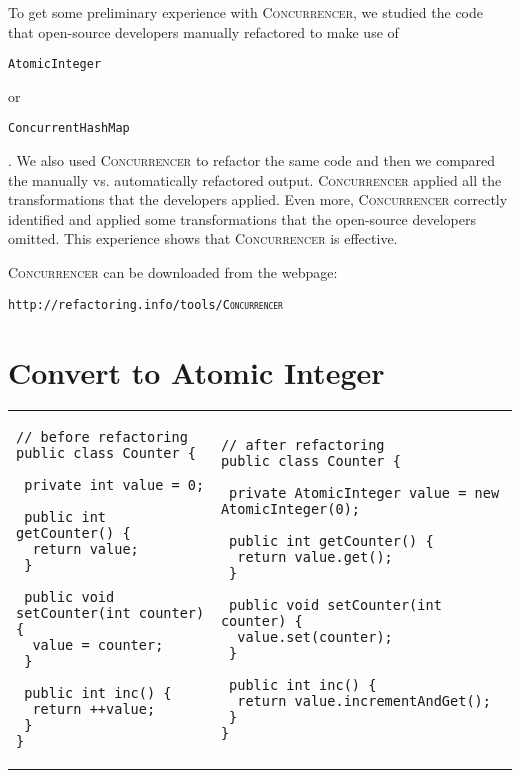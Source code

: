 \documentclass[10pt,preprint]{sigplanconf}
\newcommand\tool{{\smaller\textsc{Concurrencer}}\xspace}
\newenvironment{CodeOut}{\begin{scriptsize}}{\end{scriptsize}}
\newcommand{\code}[1]{\begin{small}\texttt{#1}\end{small}}
\newcommand{\FullWidth}{.95\columnwidth}
\begin{document}

To get some preliminary experience with \tool, we studied
the code that open-source developers manually refactored to make use
of \code{AtomicInteger} or \code{ConcurrentHashMap}. We also used \tool to
refactor the same code and then we compared the manually vs. automatically
refactored output. \tool applied all the
transformations that the developers applied. Even more, \tool correctly
identified and applied some transformations that the open-source developers
omitted. This experience shows that \tool is effective.

\tool can be downloaded from the webpage: \\
\code{http://refactoring.info/tools/\tool}

\section{Convert to Atomic Integer}

\begin{figure*}[t]
\begin{CodeOut}
\begin{tabular}{@{}l|l@{}}
\begin{minipage}[t]{\FullWidth}
\begin{verbatim}
// before refactoring
public class Counter {

 private int value = 0;
        
 public int getCounter() {
  return value;
 }
        
 public void setCounter(int counter) {
  value = counter;
 }
        
 public int inc() {
  return ++value;
 }
}
\end{verbatim}
\end{minipage}
&
\begin{minipage}[t]{\FullWidth}
\begin{verbatim}
// after refactoring
public class Counter {
 
 private AtomicInteger value = new AtomicInteger(0);
        
 public int getCounter() {
  return value.get();
 }
        
 public void setCounter(int counter) {
  value.set(counter);
 }
        
 public int inc() {
  return value.incrementAndGet();
 }
}
\end{verbatim}
\end{minipage}
\end{tabular}
\end{CodeOut}
\caption{Using \tool to refactor an \texttt{int} field to
\texttt{AtomicInteger} in some real Apache Tomcat code. Left/right shows code
before/after refactoring.}
\label{fig:CounterExample}
\end{figure*}
\end{document}
